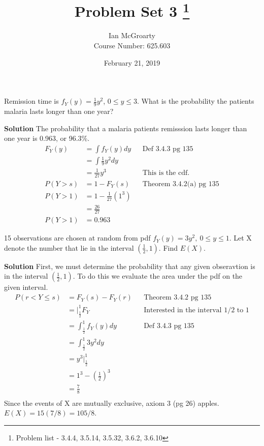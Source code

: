 \documentclass[12pt]{article}
\title{Problem Set 3 \thanks{Problem list - 3.4.4, 3.5.14, 3.5.32, 3.6.2, 3.6.10}}
\author{Ian McGroarty \\
	Course Number: 625.603}
\date{February 21, 2019}
\newenvironment{problem}[2][Problem]{\begin{trivlist}
\item[\hskip \labelsep {\bfseries #1}\hskip \labelsep {\bfseries #2.}]}{\end{trivlist}}
\begin{document}
\maketitle

\begin{problem}{3.4.4} Remission time is $f_Y(y) = \frac{1}{9}y^2$, $0 \leq y \leq 3$. What is the probability the patients malaria lasts longer than one year?

\textbf{Solution} The probability that a malaria patients remisssion lasts longer than one year is 0.963, or 96.3\%.   
\begin{align*}
F_Y(y) &= \int f_Y(y)dy  && \text{Def 3.4.3 pg 135} \\
&= \int \frac{1}{9} y^2 dy \\
&= \frac{1}{27}y^3 && \text{This is the cdf.} \\
P(Y>s) &= 1-F_Y(s) && \text{Theorem 3.4.2(a) pg 135} \\
P(Y>1) &= 1 - \frac{1}{27}(1^3) \\
	&= \frac{26}{27} \\
P(Y>1) &= 0.963
\end{align*}
\end{problem}

\begin{problem}{3.5.14} 15 observations are chosen at random from pdf $f_Y(y) = 3y^2, \ 0 \leq y \leq 1$. Let X denote the number that lie in the interval $(\frac{1}{2},1)$. Find $E(X)$. 

\textbf{Solution} 
First, we must determine the probability that any given obseravtion is in the interval $(\frac{1}{2},1)$. To do this we evaluate the area under the pdf on the given interval. 
\begin{align*}
P(r<Y\leq s) &= F_Y(s) - F_Y(r) && \text{Theorem 3.4.2 pg 135} \\
&= \Big|_{\frac{1}{2}}^1 F_Y && \text{Interested in the interval 1/2 to 1} \\
&= \int_{\frac{1}{2}}^1 f_Y(y) dy && \text{Def 3.4.3 pg 135} \\
&= \int_{\frac{1}{2}}^1 3y^2 dy \\
&= y^3  \Big|_{\frac{1}{2}}^1  \\
&= 1^3 - (\frac{1}{2})^3  \\
&= \frac{7}{8} \\
\end{align*}
Since the events of X are mutually exclusive, axiom 3 (pg 26) apples. $E(X)=15(7/8)=105/8$. 
\end{problem}
\end{document}
